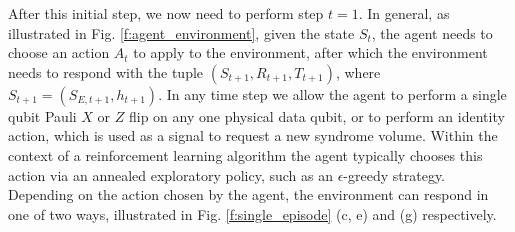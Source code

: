 \documentclass[twocolumn,preprintnumbers,amsmath,amssymb,notitlepage,nofootinbib,longbibliography,superscriptaddress,aps,pra,10pt]{revtex4-1}
\begin{document}
    After this initial step, we now need to perform step $t=1$. 
    In general, as illustrated in Fig. \ref{f:agent_environment}, given the state $S_t$, the agent needs to choose an action $A_t$ to apply to the environment, after which the environment needs to respond with the tuple $(S_{t+1}, R_{t+1}, T_{t+1})$, where $S_{t+1}=(S_{E,{t+1}},h_{t+1})$.
    In any time step we allow the agent to perform a single qubit Pauli $X$ or $Z$ flip on any one physical data qubit, or to perform an identity action, which is used as a signal to request a new syndrome volume.
    Within the context of a reinforcement learning algorithm the agent typically chooses this action via an annealed exploratory policy, such as an $\epsilon$-greedy strategy.
    Depending on the action chosen by the agent, the environment can respond in one of two ways, illustrated in Fig. \ref{f:single_episode} (c, e) and (g) respectively.
\end{document}
